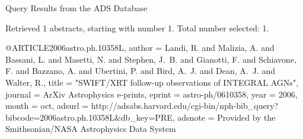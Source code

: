 Query Results from the ADS Database


Retrieved 1 abstracts, starting with number 1.  Total number selected: 1.

@ARTICLE{2006astro.ph.10358L,
   author = {{Landi}, R. and {Malizia}, A. and {Bassani}, L. and {Masetti}, N. and 
	{Stephen}, J.~B. and {Gianotti}, F. and {Schiavone}, F. and 
	{Bazzano}, A. and {Ubertini}, P. and {Bird}, A.~J. and {Dean}, A.~J. and 
	{Walter}, R.},
    title = "{SWIFT/XRT follow-up observations of INTEGRAL AGNs}",
  journal = {ArXiv Astrophysics e-prints},
   eprint = {astro-ph/0610358},
     year = 2006,
    month = oct,
   adsurl = {http://adsabs.harvard.edu/cgi-bin/nph-bib_query?bibcode=2006astro.ph.10358L&db_key=PRE},
  adsnote = {Provided by the Smithsonian/NASA Astrophysics Data System}
}


